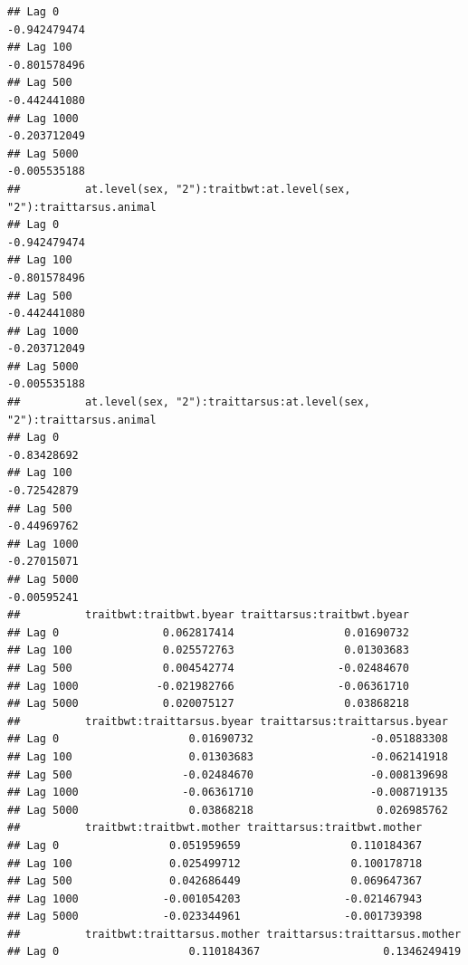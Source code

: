 \documentclass[
  12pt,
]{book}
\begin{document}
\begin{verbatim}
## Lag 0                                                         -0.942479474
## Lag 100                                                       -0.801578496
## Lag 500                                                       -0.442441080
## Lag 1000                                                      -0.203712049
## Lag 5000                                                      -0.005535188
##          at.level(sex, "2"):traitbwt:at.level(sex, "2"):traittarsus.animal
## Lag 0                                                         -0.942479474
## Lag 100                                                       -0.801578496
## Lag 500                                                       -0.442441080
## Lag 1000                                                      -0.203712049
## Lag 5000                                                      -0.005535188
##          at.level(sex, "2"):traittarsus:at.level(sex, "2"):traittarsus.animal
## Lag 0                                                             -0.83428692
## Lag 100                                                           -0.72542879
## Lag 500                                                           -0.44969762
## Lag 1000                                                          -0.27015071
## Lag 5000                                                          -0.00595241
##          traitbwt:traitbwt.byear traittarsus:traitbwt.byear
## Lag 0                0.062817414                 0.01690732
## Lag 100              0.025572763                 0.01303683
## Lag 500              0.004542774                -0.02484670
## Lag 1000            -0.021982766                -0.06361710
## Lag 5000             0.020075127                 0.03868218
##          traitbwt:traittarsus.byear traittarsus:traittarsus.byear
## Lag 0                    0.01690732                  -0.051883308
## Lag 100                  0.01303683                  -0.062141918
## Lag 500                 -0.02484670                  -0.008139698
## Lag 1000                -0.06361710                  -0.008719135
## Lag 5000                 0.03868218                   0.026985762
##          traitbwt:traitbwt.mother traittarsus:traitbwt.mother
## Lag 0                 0.051959659                 0.110184367
## Lag 100               0.025499712                 0.100178718
## Lag 500               0.042686449                 0.069647367
## Lag 1000             -0.001054203                -0.021467943
## Lag 5000             -0.023344961                -0.001739398
##          traitbwt:traittarsus.mother traittarsus:traittarsus.mother
## Lag 0                    0.110184367                   0.1346249419

\end{verbatim}
\end{document}
